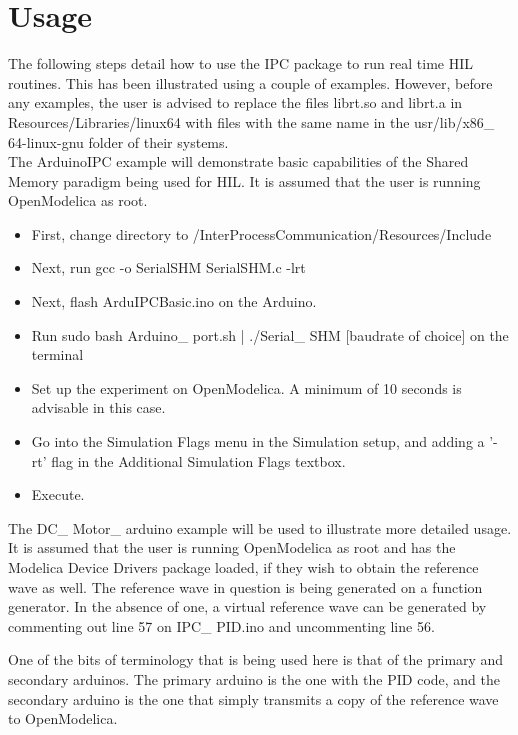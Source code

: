 \documentclass{hitec}
\begin{document}
\section{Usage}
The following steps detail how to use the IPC package to run real time HIL routines. This has been illustrated using a couple of examples. However, before any examples, the user is advised to replace the files librt.so and librt.a in  Resources/Libraries/linux64 with files with the same name in the usr/lib/x86\_ 64-linux-gnu folder of their systems.
\\
The ArduinoIPC example will demonstrate basic capabilities of the Shared Memory paradigm being used for HIL. It is assumed that the user is running OpenModelica as root.
\\
\begin{itemize}
  \item First, change directory to /InterProcessCommunication/Resources/Include
  \item Next, run gcc -o Serial\textunderscore SHM Serial\textunderscore SHM.c -lrt
  \item Next, flash ArduIPCBasic.ino on the Arduino.
  \item Run sudo bash Arduino\_ port.sh | ./Serial\_ SHM [baudrate of choice] on the terminal
  \item Set up the experiment on OpenModelica. A minimum of 10 seconds is advisable in this case. 
  \item Go into the Simulation Flags menu in the Simulation setup, and adding a '-rt' flag in the Additional Simulation Flags textbox.
  \item Execute.
  \end{itemize}
The DC\_ Motor\_ arduino example will be used to illustrate more detailed usage. It is assumed that the user is running OpenModelica as root and has the Modelica Device Drivers package loaded, if they wish to obtain the reference wave as well. The reference wave in question is being generated on a function generator. In the absence of one, a virtual reference wave can be generated by commenting out line 57 on IPC\_ PID.ino and uncommenting line 56.

 One of the bits of terminology that is being used here is that of the primary and secondary arduinos. The primary arduino is the one with the PID code, and the secondary arduino is the one that simply transmits a copy of the reference wave to OpenModelica.
\end{document}
